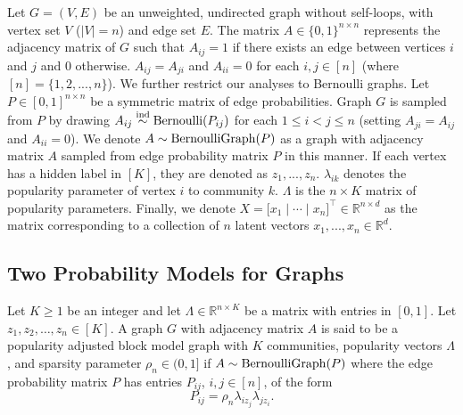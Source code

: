 \documentclass[12pt]{article}
\begin{document}
Let $G = (V, E)$ be an unweighted, undirected graph without self-loops, with vertex set $V$ ($|V| = n$) and edge set $E$. The matrix
$A \in \{0, 1\}^{n \times n}$ represents the adjacency matrix of $G$ 
such that $A_{ij} = 1$ if there exists an edge between vertices $i$ and $j$ 
and $0$ otherwise. 
$A_{ij} = A_{ji}$ and $A_{ii} = 0$ for each $i, j \in [n]$ (where $[n] = \{1, 2, ..., n\}$). 
We further restrict our analyses to Bernoulli graphs. 
Let $P \in [0, 1]^{n \times n}$ be a symmetric matrix of edge probabilities. 
Graph $G$ is sampled from $P$ by drawing $A_{ij} \stackrel{\mathrm{ind}}{\sim} \mathrm{Bernoulli}(P_{ij})$ 
for each $1 \leq i < j \leq n$ (setting $A_{ji} = A_{ij}$ and $A_{ii} = 0$). 
We denote $A \sim \mathrm{BernoulliGraph}(P)$ as a graph with adjacency matrix $A$ 
sampled from edge probability matrix $P$ in this manner. 
If each vertex has a hidden label in $[K]$, 
they are denoted as $z_1, ..., z_n$. 
$\lambda_{ik}$ denotes the popularity parameter of vertex $i$ to community $k$. 
$\Lambda$ is the $n \times K$ matrix of popularity parameters. 
Finally, we denote 
$X = \bigl[x_1 \mid \cdots \mid x_n\bigr]^\top \in \mathbb{R}^{n \times d}$ 
as the matrix corresponding to a collection of $n$ latent vectors $x_1, ..., x_n \in \mathbb{R}^d$.

\hypertarget{the-popularity-adjusted-block-model-and-the-generalized-random-dot-product-graph}{%
\subsection{Two Probability Models for Graphs}\label{the-popularity-adjusted-block-model-and-the-generalized-random-dot-product-graph}}

\begin{definition}
\label{pabm}
Let $K \geq 1$ be an integer and let $\Lambda \in \mathbb{R}^{n \times
  K}$ be a matrix with entries in $[0,1]$. Let $z_1, z_2, \dots, z_n
\in [K]$. A graph $G$ with adjacency matrix $A$ is said to
be a popularity adjusted block model graph with $K$ communities, popularity vectors
$\Lambda$, and sparsity parameter $\rho_n \in (0,1]$ if $A \sim \mathrm{BernoulliGraph}(P)$
where the edge probability matrix $P$ has entries $P_{ij}$, $i, j \in [n]$, of the form
$$P_{ij} = \rho_n \lambda_{iz_j} \lambda_{jz_i}.$$
\end{definition}
\end{document}
